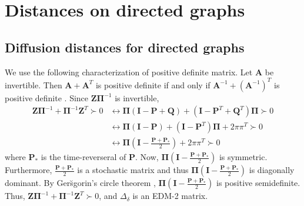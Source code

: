 \chapter{Distances on directed graphs}

\section{Diffusion distances for directed graphs}
\label{sec:diff-dist-direct}
We use the following characterization of positive definite matrix. Let
$\mathbf{A}$ be invertible. Then $\mathbf{A} + \mathbf{A}^{T}$ is
positive definite if and only if $\mathbf{A}^{-1} +
(\mathbf{A}^{-1})^{T}$ is positive definite
\cite{horn94:_topic_in_matrix_analy}. Since $\mathbf{Z}\bm{\Pi}^{-1}$
is invertible,
  \begin{equation}
    \label{eq:34}
    \begin{split}
    \mathbf{Z}\bm{\Pi}^{-1} + \bm{\Pi}^{-1}\mathbf{Z}^{T} \succ 0
    & \leftrightarrow \bm{\Pi}(\mathbf{I} - \mathbf{P} + \mathbf{Q}) + (\mathbf{I} -
    \mathbf{P}^{T} + \mathbf{Q}^{T})\bm{\Pi} \succ 0 \\
    & \leftrightarrow \bm{\Pi}(\mathbf{I} - \mathbf{P}) + (\mathbf{I} -
    \mathbf{P}^{T})\bm{\Pi} + 2 \pi \pi^{T} \succ 0 \\
    & \leftrightarrow \bm{\Pi}(\mathbf{I} - \frac{\mathbf{P} + \mathbf{P}_{*}}{2})
    + 2 \pi \pi^{T} \succ 0
  \end{split}      
  \end{equation}
  where $\mathbf{P}_{*}$ is the time-reverseral of $\mathbf{P}$. Now,
  $\bm{\Pi}(\mathbf{I} - \frac{\mathbf{P} + \mathbf{P}_{*}}{2})$ is
  symmetric. Furthermore, $\frac{\mathbf{P} + \mathbf{P}_{*}}{2}$ is a
  stochastic matrix and thus $\bm{\Pi}(\mathbf{I} - \frac{\mathbf{P} +
    \mathbf{P}_{*}}{2})$ is diagonally dominant. By Ger\u{s}gorin's
  circle theorem \cite{gersgorin31:_uber_abgren_eigen_matrix},
  $\bm{\Pi}(\mathbf{I} - \frac{\mathbf{P} + \mathbf{P}_{*}}{2})$ is
  positive semidefinite. Thus, $\mathbf{Z}\bm{\Pi}^{-1} +
  \bm{\Pi}^{-1}\mathbf{Z}^{T} \succ 0$, and $\Delta_{\delta}$ is an
  EDM-2 matrix.
